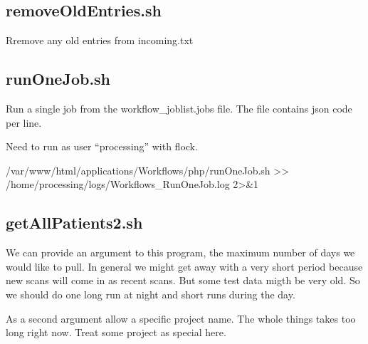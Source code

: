 \documentclass[letterpaper,10pt,english]{sphinxmanual}
\begin{document}
\subsection{removeOldEntries.sh}
\label{\detokenize{Architecture/scripts/removeOldEntries:removeoldentries-sh}}\label{\detokenize{Architecture/scripts/removeOldEntries::doc}}
\sphinxAtStartPar
Rremove any old entries from incoming.txt

\sphinxstepscope


\subsection{runOneJob.sh}
\label{\detokenize{Architecture/scripts/runOneJob:runonejob-sh}}\label{\detokenize{Architecture/scripts/runOneJob::doc}}
\sphinxAtStartPar
Run a single job from the workflow\_joblist.jobs file. The file contains json code per line.

\sphinxAtStartPar
Need to run as user “processing” with flock.
\begin{description}
\begin{description}
\sphinxAtStartPar
/var/www/html/applications/Workflows/php/runOneJob.sh \textgreater{}\textgreater{} /home/processing/logs/Workflows\_RunOneJob.log 2\textgreater{}\&1

\end{description}

\end{description}

\sphinxstepscope


\subsection{getAllPatients2.sh}
\label{\detokenize{Architecture/scripts/getAllPatients2:getallpatients2-sh}}\label{\detokenize{Architecture/scripts/getAllPatients2::doc}}
\sphinxAtStartPar
We can provide an argument to this program, the maximum number of days we would like to pull. In general we might get away with a very short
period because new scans will come in as recent scans. But some test data migth be very old. So we should do one long run at night and short
runs during the day.

\sphinxAtStartPar
As a second argument allow a specific project name. The whole things takes too long right now. Treat some project as special here.
\end{document}
